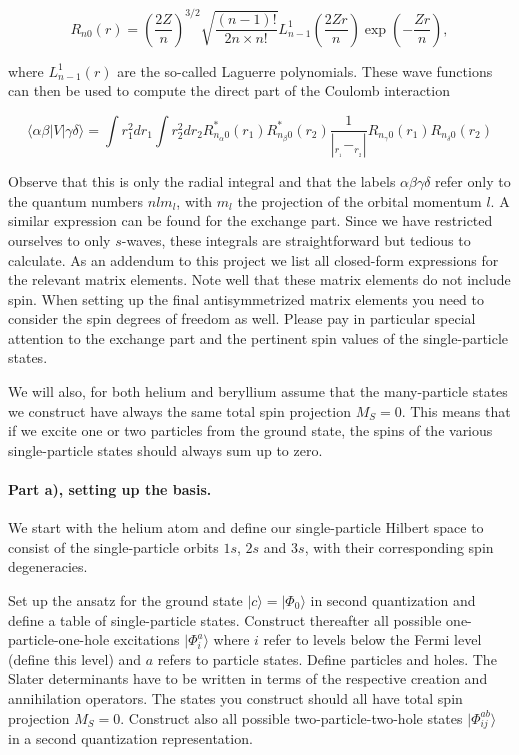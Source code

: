 \documentclass[%
oneside,                 %
final,                   %
10pt]{article}
\begin{document}
\begin{equation*}
R_{n0}(r)=\left(\frac{2Z}{n}\right)^{3/2}\sqrt{\frac{(n-1)!}{2n\times n!}}L_{n-1}^1(\frac{2Zr}{n})\exp{(-\frac{Zr}{n})},
\end{equation*}

where $L_{n-1}^1(r)$ are the so-called Laguerre polynomials.  These
wave functions can then be used to compute the direct part of the
Coulomb interaction

\begin{equation*}
\langle \alpha\beta| V| \gamma\delta\rangle = \int r_1^2dr_1 \int r_2^2dr_2R_{n_{\alpha}0}^*(r_1) R_{n_{\beta}0}^*(r_2) 
  \frac{1}{| _r__1-_r__2|}R_{n_{\gamma}0}(r_1)R_{n_{\delta}0}(r_2)
\end{equation*}

Observe that this is only the radial integral and that the labels
$\alpha\beta\gamma\delta$ refer only to the quantum numbers $nlm_l$,
with $m_l$ the projection of the orbital momentum $l$.  A similar
expression can be found for the exchange part. Since we have
restricted ourselves to only $s$-waves, these integrals are
straightforward but tedious to calculate. As an addendum to this
project we list all closed-form expressions for the relevant matrix
elements. Note well that these matrix elements do not include
spin. When setting up the final antisymmetrized matrix elements you
need to consider the spin degrees of freedom as well. Please pay in
particular special attention to the exchange part and the pertinent
spin values of the single-particle states.


We will also, for both helium and beryllium assume that the
many-particle states we construct have always the same total spin
projection $M_S=0$. This means that if we excite one or two particles
from the ground state, the spins of the various single-particle states
should always sum up to zero.


\paragraph{Part a), setting up the basis.}
We start with the helium atom and define our single-particle Hilbert space to consist of the single-particle orbits $1s$, $2s$ and $3s$, with their corresponding spin degeneracies.

Set up the ansatz for the ground state $|c\rangle = |\Phi_0\rangle$ in second 
quantization and define a table of single-particle states. Construct thereafter
all possible one-particle-one-hole excitations  $|\Phi_i^a\rangle$ where $i$ refer to levels below the Fermi level (define this level) and $a$ refers to particle states. Define particles and holes. The Slater determinants have to be written in terms of the respective creation and annihilation operators.
The states you construct should all have total spin projection $M_S=0$. 
Construct also all possible two-particle-two-hole states $|\Phi_{ij}^{ab}\rangle$  in a second quantization representation. 
\end{document}
